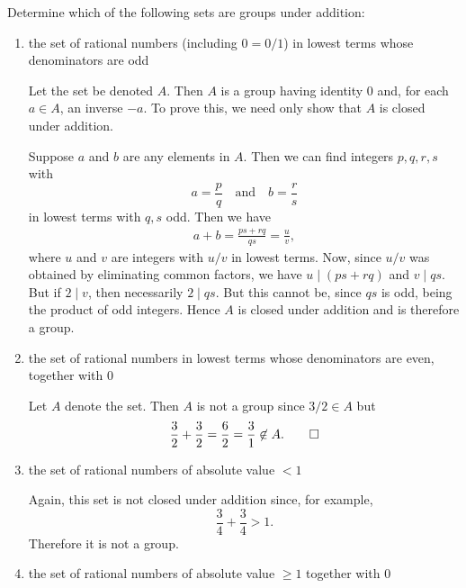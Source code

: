  Determine which of the following sets are groups under
addition:
\begin{enumerate}
\item the set of rational numbers (including $0 = 0/1$) in lowest
  terms whose denominators are odd
  \begin{solution}
    Let the set be denoted $A$. Then $A$ is a group having identity
    $0$ and, for each $a\in A$, an inverse $-a$. To prove this, we
    need only show that $A$ is closed under addition.

    Suppose $a$ and $b$ are any elements in $A$. Then we can find
    integers $p,q,r,s$ with
    \begin{equation*}
      a = \frac{p}{q}\quad\text{and}\quad
      b = \frac{r}{s}
    \end{equation*}
    in lowest terms with $q,s$ odd. Then we have
    \begin{align*}
      a + b = \frac{ps+rq}{qs} = \frac{u}{v},
    \end{align*}
    where $u$ and $v$ are integers with $u/v$ in lowest terms. Now,
    since $u/v$ was obtained by eliminating common factors, we have
    $u\mid(ps+rq)$ and $v\mid qs$. But if $2\mid v$, then necessarily
    $2\mid qs$. But this cannot be, since $qs$ is odd, being the
    product of odd integers. Hence $A$ is closed under addition and is
    therefore a group.
  \end{solution}
\item the set of rational numbers in lowest terms whose denominators
  are even, together with $0$
  \begin{solution}
    Let $A$ denote the set. Then $A$ is not a group since $3/2\in A$
    but
    \begin{equation*}
      \frac32 + \frac32 = \frac62 = \frac31\not\in A. \qedhere
    \end{equation*}
  \end{solution}
\item the set of rational numbers of absolute value $<1$
  \begin{solution}
    Again, this set is not closed under addition since, for example,
    \begin{equation*}
      \frac34 + \frac34 > 1.
    \end{equation*}
    Therefore it is not a group.
  \end{solution}
\item the set of rational numbers of absolute value $\geq1$ together
  with $0$
  \begin{solution}

\end{solution}
\end{enumerate}
